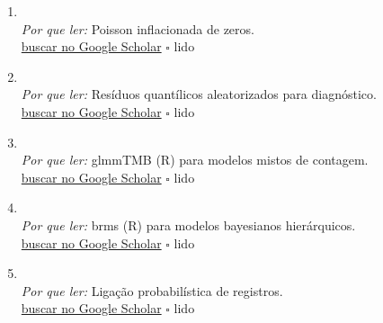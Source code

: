 \begin{enumerate}[leftmargin=*]
  \item {}\\
  \textit{Por que ler:} Poisson inflacionada de zeros.\\
  \href{https://scholar.google.com/scholar?q=Zero-inflated+Poisson+regression\%2C+with+an+application+to+defects+in+manufacturing}{buscar no Google Scholar} \hfill $\square$ \textsf{\small lido}
  \item {}\\
  \textit{Por que ler:} Resíduos quantílicos aleatorizados para diagnóstico.\\
  \href{https://scholar.google.com/scholar?q=Randomized+quantile+residuals}{buscar no Google Scholar} \hfill $\square$ \textsf{\small lido}
  \item {}\\
  \textit{Por que ler:} glmmTMB (R) para modelos mistos de contagem.\\
  \href{https://scholar.google.com/scholar?q=glmmTMB+balances+speed+and+flexibility+among+packages+for+zero-inflated+generalized+linear+mixed+modeling}{buscar no Google Scholar} \hfill $\square$ \textsf{\small lido}
  \item {}\\
  \textit{Por que ler:} brms (R) para modelos bayesianos hierárquicos.\\
  \href{https://scholar.google.com/scholar?q=brms\%3A+an+R+package+for+Bayesian+multilevel+models+using+Stan}{buscar no Google Scholar} \hfill $\square$ \textsf{\small lido}
  \item {}\\
  \textit{Por que ler:} Ligação probabilística de registros.\\
  \href{https://scholar.google.com/scholar?q=A+theory+for+record+linkage}{buscar no Google Scholar} \hfill $\square$ \textsf{\small lido}
\end{enumerate}

